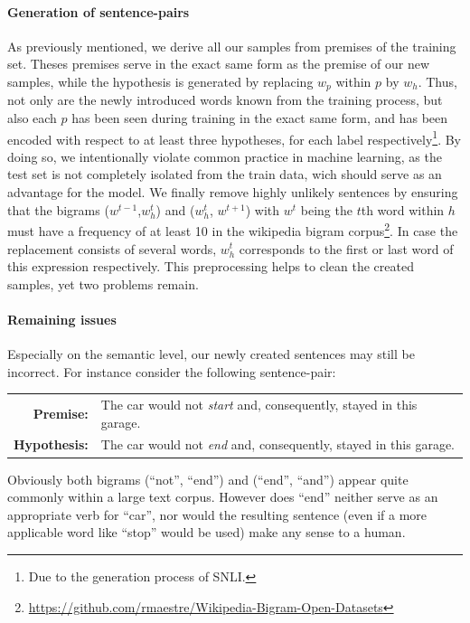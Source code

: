 \paragraph*{Generation of sentence-pairs}
As previously mentioned, we derive all our samples from premises of the training set. Theses premises serve in the exact same form as the premise of our new samples, while the hypothesis is generated by replacing $w_p$ within $p$ by $w_h$. Thus, not only are the newly introduced words known from the training process, but also each $p$ has been seen during training in the exact same form, and has been encoded with respect to at least three hypotheses, for each label respectively\footnote{Due to the generation process of \ac{SNLI}.}. By doing so, we intentionally violate common practice in machine learning, as the test set is not completely isolated from the train data, wich should serve as an advantage for the model. We finally remove highly unlikely sentences by ensuring that the bigrams  ($w^{t-1}$,$w_h^t$) and ($w_h^t$, $w^{t+1}$) with $w^t$ being the $t$th word within $h$ must have a frequency of at least 10 in the wikipedia bigram corpus\footnote{\href{https://github.com/rmaestre/Wikipedia-Bigram-Open-Datasets}{https://github.com/rmaestre/Wikipedia-Bigram-Open-Datasets}}. In case the replacement consists of several words, $w^t_h$ corresponds to the first or last word of this expression respectively. This preprocessing helps to clean the created samples, yet two problems remain.

\paragraph*{Remaining issues}

Especially on the semantic level, our newly created sentences may still be incorrect. For instance consider the following sentence-pair:
\begin{center}
\begin{tabular}{rl}
\textbf{Premise:} & The car would not \textit{start} and, consequently, stayed in this garage. \\
\textbf{Hypothesis:} & The car would not \textit{end} and, consequently, stayed in this garage.
\end{tabular}
\end{center}
Obviously both bigrams (``not'', ``end'') and (``end'', ``and'') appear quite commonly within a large text corpus. However does ``end'' neither serve as an appropriate verb for ``car'', nor would the resulting sentence (even if a more applicable word like ``stop'' would be used) make any sense to a human.
\newline

